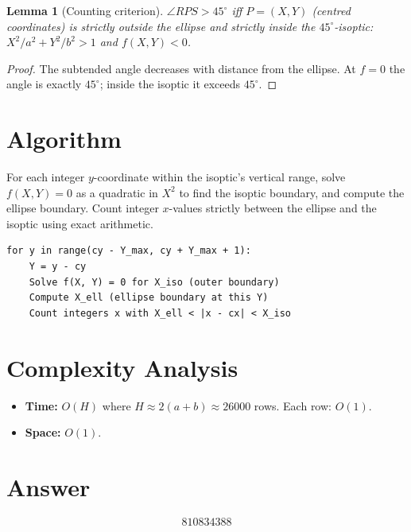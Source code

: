 \documentclass[12pt]{article}
\newtheorem{lemma}[theorem]{Lemma}
\begin{document}
\begin{lemma}[Counting criterion]\label{lem:count}
$\angle RPS>45^\circ$ iff $P=(X,Y)$ (centred coordinates) is strictly outside the ellipse and strictly inside the $45^\circ$-isoptic: $X^2/a^2+Y^2/b^2>1$ and $f(X,Y)<0$.
\end{lemma}

\begin{proof}
The subtended angle decreases with distance from the ellipse. At $f=0$ the angle is exactly $45^\circ$; inside the isoptic it exceeds $45^\circ$.
\end{proof}

\section{Algorithm}

For each integer $y$-coordinate within the isoptic's vertical range, solve $f(X,Y)=0$ as a quadratic in $X^2$ to find the isoptic boundary, and compute the ellipse boundary. Count integer $x$-values strictly between the ellipse and the isoptic using exact arithmetic.

\begin{verbatim}
for y in range(cy - Y_max, cy + Y_max + 1):
    Y = y - cy
    Solve f(X, Y) = 0 for X_iso (outer boundary)
    Compute X_ell (ellipse boundary at this Y)
    Count integers x with X_ell < |x - cx| < X_iso
\end{verbatim}

\section{Complexity Analysis}

\begin{itemize}
\item \textbf{Time:} $O(H)$ where $H\approx 2(a+b)\approx 26000$ rows. Each row: $O(1)$.
\item \textbf{Space:} $O(1)$.
\end{itemize}

\section{Answer}

\[
\boxed{810834388}
\]
\end{document}
